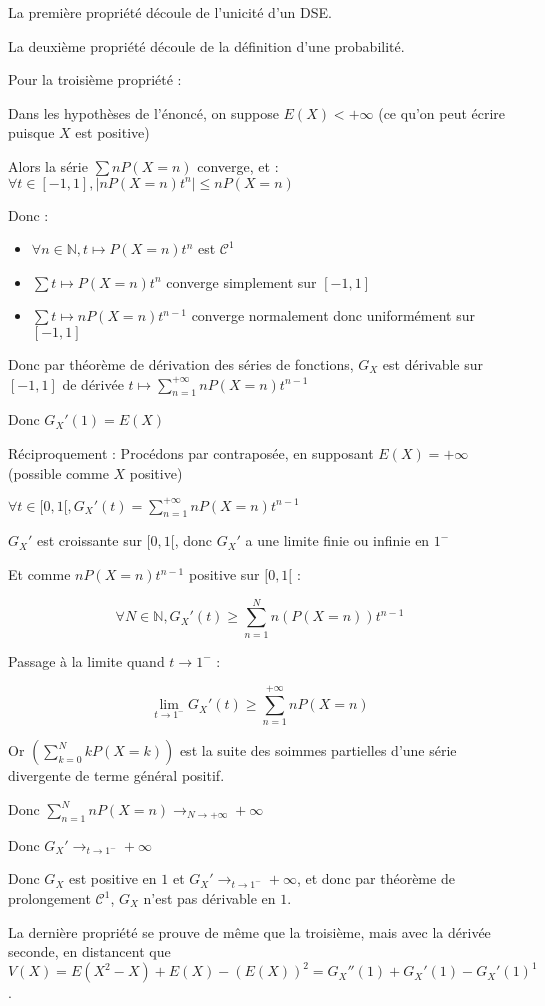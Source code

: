 \documentclass[a4paper,12pt]{book}
\newcommand{\Pre}[1]{\begin{tcolorbox}[sharp corners, colback=white,colframe=green!60!green!30!black!75, title=Preuve]#1\end{tcolorbox}}
\def\N{\mathbb{N}}
\begin{document}
\Pre{La première propriété découle de l'unicité d'un DSE.
\par La deuxième propriété découle de la définition d'une probabilité.
\par Pour la troisième propriété :
\par Dans les hypothèses de l'énoncé, on suppose $E(X)<+\infty$ (ce qu'on peut écrire puisque $X$ est positive)
\par Alors la série $\sum nP(X=n)$ converge, et : $\forall t\in [-1,1], \vert nP(X=n)t^n\vert\leq nP(X=n)$
\par Donc :\begin{itemize}
\item $\forall n\in\N, t\mapsto P(X=n)t^n$ est $\mathcal{C}^1$
\item $\sum t\mapsto P(X=n)t^n$ converge simplement sur $[-1,1]$
\item $\sum t\mapsto nP(X=n)t^{n-1}$ converge normalement donc uniformément sur $[-1,1]$
\end{itemize}
\par Donc par théorème de dérivation des séries de fonctions, $G_X$ est dérivable sur $[-1,1]$ de dérivée $t\mapsto \sum\limits_{n=1}^{+\infty}nP(X=n)t^{n-1}$
\par Donc $G_X'(1)=E(X)$
\par Réciproquement : Procédons par contraposée, en supposant $E(X)=+\infty$ (possible comme $X$ positive)
\par $\forall t\in[0,1[, G_X'(t)=\sum\limits_{n=1}^{+\infty}nP(X=n)t^{n-1}$
\par $G_X'$ est croissante sur $[0,1[$, donc $G_X'$ a une limite finie ou infinie en $1^-$
\par Et comme $nP(X=n)t^{n-1}$ positive sur $[0,1[$ :
\par $$\forall N\in\N, G_X'(t)\geq \sum\limits_{n=1}^Nn(P(X=n))t^{n-1}$$
\par Passage à la limite quand $t\to 1^-$ :
\par $$\lim\limits_{t\to 1^-}G_X'(t) \geq \sum\limits_{n=1}^{+\infty}nP(X=n)$$
\par Or $\left(\sum\limits_{k=0}^N kP(X=k)\right)$ est la suite des soimmes partielles d'une série divergente de terme général positif.
\par Donc $\sum\limits_{n=1}^NnP(X=n)\to_{N\to+\infty}+\infty$
\par Donc $G_X'\to_{t\to 1^-}+\infty$
\par Donc $G_X$ est positive en $1$ et $G_X'\to_{t\to 1^-}+\infty$, et donc par théorème de prolongement $\mathcal{C}^1$, $G_X$ n'est pas dérivable en $1$.
\par La dernière propriété se prouve de même que la troisième, mais avec la dérivée seconde, en distancent que $V(X) = E(X^2-X) + E(X) - (E(X))^2 = G_X''(1)+G_X'(1)-G_X'(1)^1$.}
\end{document}
